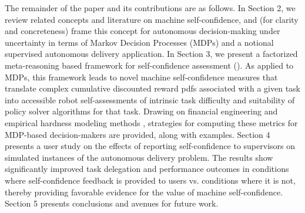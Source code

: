The remainder of the paper and its contributions are as follows. 
In Section 2, we review related concepts and literature on machine self-confidence, and (for clarity and concreteness) frame this concept for autonomous decision-making under uncertainty in terms of Markov Decision Processes (MDPs) and a notional supervised autonomous delivery application. 
In Section 3, we present a factorized meta-reasoning based framework for self-confidence assessment (\famsec). As applied to MDPs, this framework leads to novel machine self-confidence measures that translate complex cumulative discounted reward pdfs associated with a given task into accessible robot self-assessments of intrinsic task difficulty and suitability of policy solver algorithms for that task. 
Drawing on financial engineering \cite{wojt2009portfolio} and empirical hardness modeling methods \cite{Leyton-Brown2009-yr}, strategies for computing these metrics for MDP-based decision-makers are provided, along with examples.  %
Section 4 presents a user study on the effects of reporting self-confidence to supervisors on simulated instances of the autonomous delivery problem. The results show significantly improved task delegation and performance outcomes in conditions where self-confidence feedback is provided to users vs. conditions where it is not, thereby providing favorable evidence for the value of machine self-confidence. Section 5 presents conclusions and avenues for future work. %
